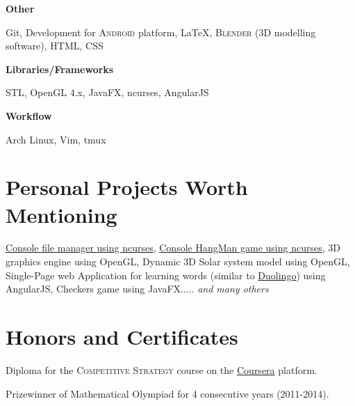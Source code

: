 \documentclass[10pt]{article}
\begin{document}
\begin{center} \large \textbf{Other} \end{center}
Git, \hspace{0.3em}
Development for \textsc{Android} platform, \hspace{0.3em}
{\fb \LaTeX}, \hspace{0.3em}
\textsc{Blender} (3D modelling software), \hspace{0.3em}
HTML, CSS

\begin{center} \large \textbf{Libraries\slash Frameworks} \end{center}
STL, \hspace{0.3em}
OpenGL 4.x, \hspace{0.3em}
JavaFX, \hspace{0.3em}
ncurses, \hspace{0.3em}
AngularJS

\begin{center} \large \textbf{Workflow} \end{center}
Arch Linux, \hspace{0.3em}
Vim, \hspace{0.3em}
tmux

\section{Personal Projects Worth Mentioning}
\href{https://www.duolingo.com/}{Console file manager using ncurses}, \href{https://www.duolingo.com/}{Console HangMan game using ncurses}, 3D graphics engine using OpenGL, Dynamic 3D Solar system model using OpenGL, Single-Page web Application for learning words (similar to \href{https://www.duolingo.com/}{Duolingo}) using AngularJS, Checkers game using JavaFX..... \it{and many others}

\section{Honors and Certificates}
Diploma for the \textsc{Competitive Strategy} course on the \href{https://www.coursera.org/learn/competitive-strategy}{Coursera} platform. \par
Prizewinner of Mathematical Olympiad for 4 consecutive years (2011-2014).

\end{document}

